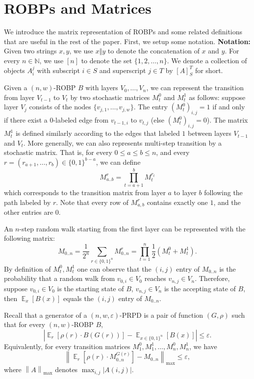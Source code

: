 \documentclass[10pt,a4paper]{article}
\DeclareMathOperator*{\Ex}{\mathbb E}
\newcommand{\ex}[2][]{\Ex_{#1}\left[#2\right]}
\newcommand{\abs}[1]{\left|#1\right|}
\newcommand{\norm}[2][]{\left\|#2\right\|_{#1}}
\newcommand{\bbN}{\mathbb N}
\newcommand{\bits}[1]{\{0,1\}^{#1}}
\newcommand{\eps}{\varepsilon}
\newcommand{\nmax}{\norm[\mathrm{max}]}
\begin{document}
\section{ROBPs and Matrices}\label{sec:matrices}
We introduce the matrix representation of ROBPs and some related definitions that are useful in the rest of the paper. First, we setup some notation.
\newline
\textbf{Notation:} Given two strings $x,y$, we use $x\Vert y$ to denote the concatenation of $x$ and $y$. For every $n\in\bbN$, we use $[n]$ to denote the set $\{1,2,\dots,n\}$. We denote a collection of objects $A_i^j$ with subscript $i\in S$ and superscript $j\in T$ by $[A]_S^T$ for short.

Given a $(n,w)$-ROBP $B$ with layers $V_0,\dots,V_n$, we can represent the transition from layer $V_{t-1}$ to $V_{t}$ by two stochastic matrices $M_t^0$ and $M_t^1$ as follows: suppose layer $V_j$ consists of the nodes $\{v_{j,1},\dots,v_{j,w}\}$.  The entry $(M_t^0)_{i,j}=1$ if and only if there exist a $0$-labeled edge from $v_{t-1,i}$ to $v_{t,j}$ (else $(M_t^0)_{i,j}=0$). The matrix $M_t^1$ is defined similarly according to the edges that labeled $1$ between layers $V_{t-1}$ and $V_t$. More generally, we can also represents multi-step transition by a stochastic matrix. That is, for every $0\le a\le b\le n$, and every $r=(r_{a+1},\ldots,r_b)\in\bits{b-a}$, we can define
$$M_{a..b}^r=\prod_{t=a+1}^b M_t^{r_t}$$
which corresponds to the transition matrix from layer $a$ to layer $b$ following the path labeled by $r$. Note that every row of $M_{a,b}^r$ contains exactly one $1$, and the other entries are $0$.

An $n$-step random walk starting from the first layer can be represented with the following matrix:
$$M_{0..n}=\frac{1}{2^n}\sum_{r\in\bits{n}}M_{0..n}^r=\prod_{t=1}^n \frac{1}{2}\left(M_t^0+M_t^1\right).$$
By definition of $M_t^0,M_t^1$ one can observe that the $(i,j)$ entry of $M_{0..n}$ is the probability that a random walk from $v_{0,i}\in V_0$  reaches $v_{n,j}\in V_n$. Therefore, suppose $v_{0,i}\in V_0$ is the starting state of $B$, $v_{n,j}\in V_n$ is the accepting state of $B$, then $\ex[x]{B(x)}$ equals the $(i,j)$ entry of $M_{0..n}$. 

Recall that a generator of a $(n,w,\eps)$-PRPD is a pair of function $(G,\rho)$ such that for every $(n,w)$-ROBP $B$,
$$\abs{\ex[r]{\rho(r)\cdot B(G(r))}-\ex[x\in\bits{n}]{B(x)}}\le \eps.$$
Equivalently, for every transition matrices $M_1^0,M_1^1,\ldots,M_n^0,M_n^1$, we have 
$$\nmax{\ex[r]{\rho(r)\cdot M_{0..n}^{G(r)}} - M_{0..n}}\le \eps,$$
where $\nmax{A}$ denotes $\max_{i,j}\abs{A(i,j)}$. 
\end{document}
